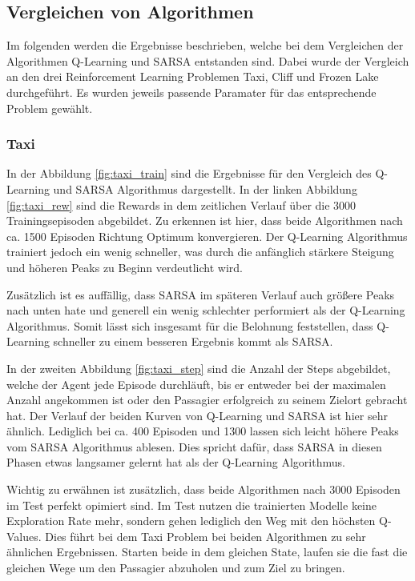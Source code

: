 \subsection{Vergleichen von Algorithmen}

Im folgenden werden die Ergebnisse beschrieben, welche bei dem Vergleichen der Algorithmen Q-Learning und SARSA entstanden sind.
Dabei wurde der Vergleich an den drei Reinforcement Learning Problemen Taxi, Cliff und Frozen Lake durchgeführt. Es wurden jeweils passende Paramater für das entsprechende Problem gewählt.
\subsubsection{Taxi}

In der Abbildung \ref{fig:taxi_train} sind die Ergebnisse für den Vergleich des Q-Learning und SARSA Algorithmus dargestellt. In der linken Abbildung \ref{fig:taxi_rew} sind die Rewards in dem zeitlichen Verlauf über die 3000 Trainingsepisoden abgebildet. Zu erkennen ist hier, dass beide Algorithmen nach ca. 1500 Episoden Richtung Optimum konvergieren. Der Q-Learning Algorithmus trainiert jedoch ein wenig schneller, was durch die anfänglich stärkere Steigung und höheren Peaks zu Beginn verdeutlicht wird.

Zusätzlich ist es auffällig, dass SARSA im späteren Verlauf auch größere Peaks nach unten hate und generell ein wenig schlechter performiert als der Q-Learning Algorithmus. Somit lässt sich insgesamt für die Belohnung feststellen, dass Q-Learning schneller zu einem besseren Ergebnis kommt als SARSA. 

In der zweiten Abbildung \ref{fig:taxi_step} sind die Anzahl der Steps abgebildet, welche der Agent jede Episode durchläuft, bis er entweder bei der maximalen Anzahl angekommen ist oder den Passagier erfolgreich zu seinem Zielort gebracht hat. Der Verlauf der beiden Kurven von Q-Learning und SARSA ist hier sehr ähnlich. Lediglich bei ca. 400 Episoden und 1300 lassen sich leicht höhere Peaks vom SARSA Algorithmus ablesen.
Dies spricht dafür, dass SARSA in diesen Phasen etwas langsamer gelernt hat als der Q-Learning Algorithmus.

Wichtig zu erwähnen ist zusätzlich, dass beide Algorithmen nach 3000 Episoden im Test perfekt opimiert sind. Im Test nutzen die trainierten Modelle keine Exploration Rate mehr, sondern gehen lediglich den Weg mit den höchsten Q-Values. Dies führt bei dem Taxi Problem bei beiden Algorithmen zu sehr ähnlichen Ergebnissen. Starten beide in dem gleichen State, laufen sie die fast die gleichen Wege um den Passagier abzuholen und zum Ziel zu bringen.

